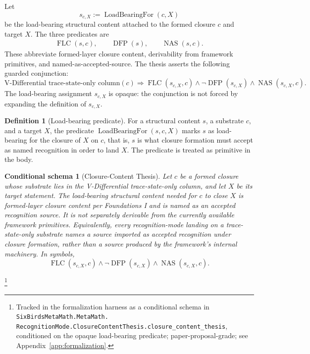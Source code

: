 \documentclass[11pt]{article}
\newcommand{\VDTSO}{V-Differential trace-state-only column}
\newtheorem{schema}[theorem]{Conditional schema}
\theoremstyle{definition}
\newtheorem{definition}[theorem]{Definition}
\begin{document}
Let
\[
  s_{c,X}:=\operatorname{LoadBearingFor}(c,X)
\]
be the load-bearing structural content attached to the formed closure
\(c\) and target \(X\).  The three predicates are
\[
\begin{aligned}
  \operatorname{FLC}(s,c),\qquad
  \operatorname{DFP}(s),\qquad
  \operatorname{NAS}(s,c).
\end{aligned}
\]
These abbreviate formed-layer closure content, derivability from
framework primitives, and named-as-accepted-source.
The thesis asserts the following guarded conjunction:
\[
  \mbox{\VDTSO}(c)
  \Longrightarrow
  \operatorname{FLC}(s_{c,X},c)\wedge
  \neg\operatorname{DFP}(s_{c,X})\wedge
  \operatorname{NAS}(s_{c,X},c).
\]
The load-bearing assignment \(s_{c,X}\) is opaque: the conjunction is
not forced by expanding the definition of \(s_{c,X}\).

\begin{definition}[Load-bearing predicate]\label{def:load-bearing}
For a structural content \(s\), a substrate \(c\), and a target \(X\),
the predicate \(\operatorname{LoadBearingFor}(s,c,X)\) marks \(s\) as
load-bearing for the closure of \(X\) on \(c\), that is, \(s\) is what
closure formation must accept as named recognition in order to land
\(X\).  The predicate is treated as primitive in the body.
\end{definition}

\begin{schema}[Closure-Content Thesis]\label{thm:closure-content-thesis}
Let \(c\) be a formed closure whose substrate lies in the \VDTSO, and let
\(X\) be its target statement. The load-bearing structural content needed
for \(c\) to close \(X\) is formed-layer closure content per Foundations I
and is named as an accepted recognition source. It is not separately
derivable from the currently available framework primitives. Equivalently,
every recognition-mode landing on a trace-state-only substrate names a
source imported as accepted recognition under closure formation, rather
than a source produced by the framework's internal machinery.
In symbols,
\[
  \operatorname{FLC}(s_{c,X},c)\wedge
  \neg\operatorname{DFP}(s_{c,X})\wedge
  \operatorname{NAS}(s_{c,X},c).
\]
\end{schema}\footnote{\raggedright Tracked in the formalization
harness as a conditional schema in
\texttt{SixBirdsMetaMath.MetaMath.\allowbreak
RecognitionMode.ClosureContentThesis.\allowbreak closure\_content\_thesis},
conditioned on the opaque load-bearing predicate; paper-proposal-grade;
see Appendix~\ref{app:formalization}.}
\end{document}
